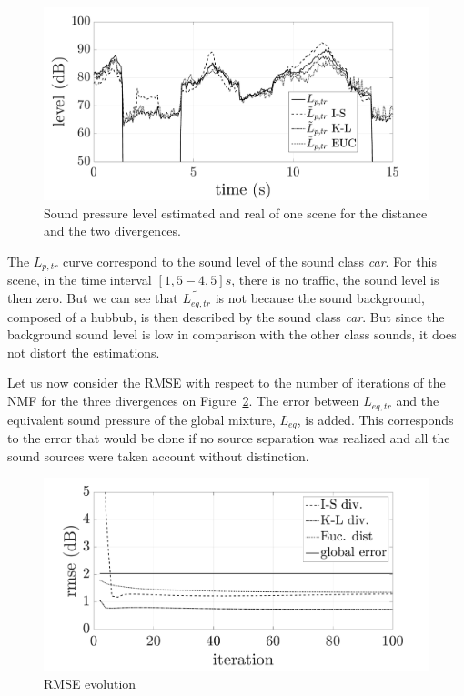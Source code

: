 \documentclass{article}
\begin{document}
\begin{sloppy}
\begin{figure}[t]
\centering
\centerline{\includegraphics[scale=0.30]{images/Lp_bvak_Sc2_It100_nbCl3.pdf}}
\caption{Sound pressure level estimated and real of one scene for the distance and the two divergences.}
\label{fig:Lp}
\end{figure}

The $L_{p,tr}$ curve correspond to the sound level of the sound class \textit{car}. For this scene, in the time interval $\left[ 1,5 - 4,5\right] s$, there is no traffic, the sound level is then zero. But we can see that $\tilde{L_{eq,tr}}$ is not because the sound background, composed of a hubbub, is then described by the sound class \textit{car}. But since the background sound level is low in comparison with the other class sounds, it does not distort the estimations.

Let us now consider the RMSE with respect to the number of iterations of the NMF for the three divergences on Figure~\ref{fig:rmse}. The error between $L_{eq,tr}$ and the equivalent sound pressure of the global mixture, $L_{eq}$, is added. This corresponds to the error that would be done if no source separation was realized and all the sound sources were taken account without distinction.\\

\begin{figure}[t]
\centering
\centerline{\includegraphics[scale=0.30]{images/comparaison_RMSE_nbCl3.pdf}}
\caption{RMSE evolution}
\label{fig:rmse}
\end{figure}


\end{sloppy}
\end{document}
